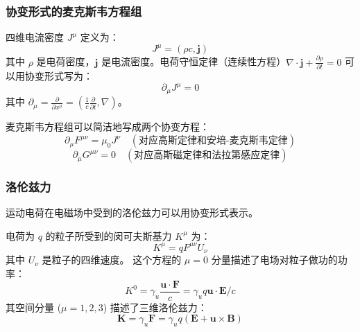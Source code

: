 \documentclass[fontset=none]{ctexart}
\begin{document}
\subsubsection{协变形式的麦克斯韦方程组}
\begin{definition}[四维电流密度]
四维电流密度 $J^{\mu}$ 定义为：
\begin{equation}
J^{\mu} = (\rho c, \bm{j})
\end{equation}
其中 $\rho$ 是电荷密度，$\bm{j}$ 是电流密度。电荷守恒定律（连续性方程）$\nabla\cdot\bm{j} + \frac{\partial\rho}{\partial t} = 0$ 可以用协变形式写为：
\begin{equation}
\partial_{\mu}J^{\mu} = 0
\end{equation}
其中 $\partial_{\mu} = \frac{\partial}{\partial x^{\mu}} = (\frac{1}{c}\frac{\partial}{\partial t}, \nabla)$。
\end{definition}
\begin{theorem}[协变形式的麦克斯韦方程组]
麦克斯韦方程组可以简洁地写成两个协变方程：
\begin{equation}
\partial_{\mu}F^{\mu\nu} = \mu_0 J^{\nu} \quad (\text{对应高斯定律和安培-麦克斯韦定律})
\end{equation}
\begin{equation}
\partial_{\mu}G^{\mu\nu} = 0 \quad (\text{对应高斯磁定律和法拉第感应定律})
\end{equation}
\end{theorem}

\subsubsection{洛伦兹力}
运动电荷在电磁场中受到的洛伦兹力可以用协变形式表示。
\begin{theorem}[协变洛伦兹力]
电荷为 $q$ 的粒子所受到的闵可夫斯基力 $K^{\mu}$ 为：
\begin{equation}
K^{\mu} = q F^{\mu\nu}U_{\nu}
\end{equation}
其中 $U_{\nu}$ 是粒子的四维速度。
这个方程的 $\mu=0$ 分量描述了电场对粒子做功的功率：
\begin{equation}
K^0 = \gamma_u \frac{\bm{u}\cdot\bm{F}}{c} = \gamma_u q \bm{u}\cdot\bm{E} / c
\end{equation}
其空间分量 ($\mu=1,2,3$) 描述了三维洛伦兹力：
\begin{equation}
\bm{K} = \gamma_u \bm{F} = \gamma_u q(\bm{E} + \bm{u} \times \bm{B})
\end{equation}
\end{theorem}
\end{document}
